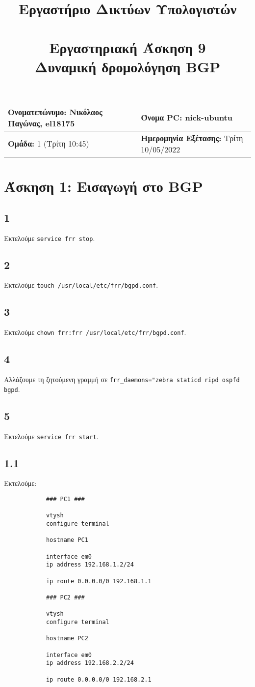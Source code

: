 \documentclass[a4paper, 12pt]{article}
\title{
	\textbf{Εργαστήριο Δικτύων Υπολογιστών} \\~\\
	Εργαστηριακή Άσκηση 9 \\ 
	Δυναμική δρομολόγηση BGP
}
\author{}
\date{}
\begin{document}
\maketitle
\begin{center}
	\begin{tabular}{|l|l|}
		\hline
		\textbf{Ονοματεπώνυμο:} Νικόλαος Παγώνας, el18175  & \textbf{Όνομα PC:} nick-ubuntu \\
		\hline
		\textbf{Ομάδα:} 1 (Τρίτη 10:45) & \textbf{Ημερομηνία Εξέτασης:} Τρίτη 10/05/2022 \\
		\hline
	\end{tabular}
\end{center}

\section*{Άσκηση 1: Εισαγωγή στο BGP}
	\subsection*{1}
		Εκτελούμε \verb|service frr stop|.

	\subsection*{2}
		Εκτελούμε \verb|touch /usr/local/etc/frr/bgpd.conf|.

	\subsection*{3}
		Εκτελούμε \verb|chown frr:frr /usr/local/etc/frr/bgpd.conf|.

	\subsection*{4}
		Αλλάζουμε τη ζητούμενη γραμμή σε \verb|frr_daemons="zebra staticd ripd ospfd bgpd|.

	\subsection*{5}
		Εκτελούμε \verb|service frr start|.
	
	\subsection*{1.1}
		Εκτελούμε:
		
		\begin{verbatim}
			### PC1 ###
			
			vtysh
			configure terminal
			
			hostname PC1
			
			interface em0
			ip address 192.168.1.2/24
			
			ip route 0.0.0.0/0 192.168.1.1
			
			### PC2 ###
			
			vtysh 
			configure terminal
			
			hostname PC2
			
			interface em0
			ip address 192.168.2.2/24
			
			ip route 0.0.0.0/0 192.168.2.1
		\end{verbatim}	
\end{document}
